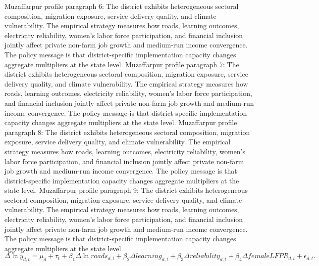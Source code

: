\documentclass[preprint,12pt]{elsarticle}
\begin{document}
Muzaffarpur profile paragraph 6: The district exhibits heterogeneous sectoral composition, migration exposure, service delivery quality, and climate vulnerability. The empirical strategy measures how roads, learning outcomes, electricity reliability, women's labor force participation, and financial inclusion jointly affect private non-farm job growth and medium-run income convergence. The policy message is that district-specific implementation capacity changes aggregate multipliers at the state level.
Muzaffarpur profile paragraph 7: The district exhibits heterogeneous sectoral composition, migration exposure, service delivery quality, and climate vulnerability. The empirical strategy measures how roads, learning outcomes, electricity reliability, women's labor force participation, and financial inclusion jointly affect private non-farm job growth and medium-run income convergence. The policy message is that district-specific implementation capacity changes aggregate multipliers at the state level.
Muzaffarpur profile paragraph 8: The district exhibits heterogeneous sectoral composition, migration exposure, service delivery quality, and climate vulnerability. The empirical strategy measures how roads, learning outcomes, electricity reliability, women's labor force participation, and financial inclusion jointly affect private non-farm job growth and medium-run income convergence. The policy message is that district-specific implementation capacity changes aggregate multipliers at the state level.
Muzaffarpur profile paragraph 9: The district exhibits heterogeneous sectoral composition, migration exposure, service delivery quality, and climate vulnerability. The empirical strategy measures how roads, learning outcomes, electricity reliability, women's labor force participation, and financial inclusion jointly affect private non-farm job growth and medium-run income convergence. The policy message is that district-specific implementation capacity changes aggregate multipliers at the state level.
\begin{equation}\Delta \ln y_{d,t}=\mu_d+\tau_t+\beta_1\Delta\ln roads_{d,t}+\beta_2\Delta learning_{d,t}+\beta_3\Delta reliability_{d,t}+\beta_4\Delta femaleLFPR_{d,t}+\epsilon_{d,t}.\end{equation}
\end{document}

